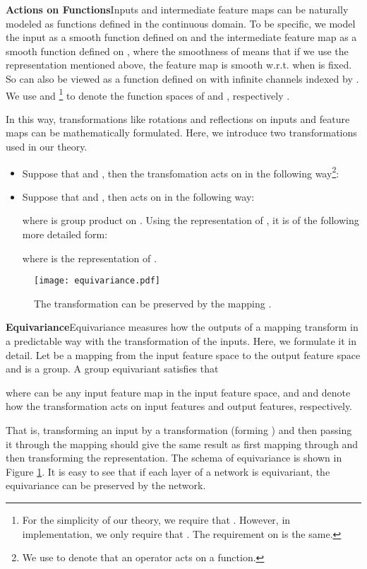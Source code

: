 \documentclass{article}
\begin{document}
\textbf{Actions on Functions}\quad Inputs and intermediate feature maps can be naturally modeled as functions defined in the continuous domain. To be specific, we model the input  as a smooth function defined on  and the intermediate feature map  as a smooth function defined on , where the smoothness of  means that if we use the representation  mentioned above, the feature map  is smooth w.r.t.  when  is fixed. So  can also be viewed as a function defined on  with infinite channels indexed by . We use  and \footnote{For the simplicity of our theory, we require that . However, in implementation, we only require that . The requirement on  is the same.} to denote the function spaces of  and , respectively .

In this way, transformations like rotations and reflections on inputs and feature maps can be mathematically formulated. Here, we introduce two transformations used in our theory.
\begin{itemize}
	\item Suppose that  and , then the transfomation  acts on  in the following way\footnote{We use  to denote that an operator acts on a function.}: 
	


	\item Suppose that  and , then  acts on  in the following way: 	
	
	where  is group product on . Using the representation of , it is of the
	following more detailed form:
	 
	where  is the representation of .
	
\end{itemize}

\begin{figure}
	\centering
	\texttt{[image: equivariance.pdf]} \caption{The transformation  can be preserved by the mapping .}
	\label{equivariance}
\end{figure}

\textbf{Equivariance}\quad Equivariance measures how the outputs of a mapping transform in a predictable way with the transformation of the inputs. Here, we formulate it in detail. Let  be a mapping from the input feature space to the output feature space and  is a group. A group equivariant  satisfies that

where  can be any input feature map in the input feature space, and  and  denote how the transformation  acts on input features and output features, respectively. 

That is, transforming an input  by a transformation  (forming ) and then passing it through the mapping  should give the same result as first mapping  through  and then transforming the representation. The schema of equivariance is shown in Figure \ref{equivariance}. It is easy to see that if each layer of a network is equivariant, the equivariance can be preserved by the network.
\end{document}
